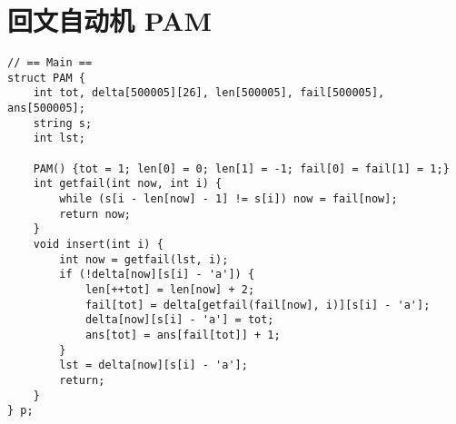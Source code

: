 \section{回文自动机 PAM}

\begin{verbatim}
// == Main ==
struct PAM {
    int tot, delta[500005][26], len[500005], fail[500005], ans[500005];
    string s;
    int lst;

    PAM() {tot = 1; len[0] = 0; len[1] = -1; fail[0] = fail[1] = 1;}
    int getfail(int now, int i) {
        while (s[i - len[now] - 1] != s[i]) now = fail[now];
        return now;
    }
    void insert(int i) {
        int now = getfail(lst, i);
        if (!delta[now][s[i] - 'a']) {
            len[++tot] = len[now] + 2;
            fail[tot] = delta[getfail(fail[now], i)][s[i] - 'a'];
            delta[now][s[i] - 'a'] = tot;
            ans[tot] = ans[fail[tot]] + 1;
        }
        lst = delta[now][s[i] - 'a'];
        return;
    }
} p;
\end{verbatim}